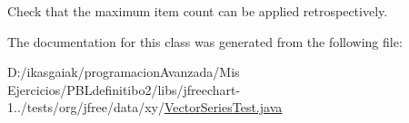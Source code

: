 Check that the maximum item count can be applied retrospectively. 

The documentation for this class was generated from the following file\+:\begin{DoxyCompactItemize}
\item 
D\+:/ikasgaiak/programacion\+Avanzada/\+Mis Ejercicios/\+P\+B\+Ldefinitibo2/libs/jfreechart-\/1../tests/org/jfree/data/xy/\mbox{\hyperlink{_vector_series_test_8java}{Vector\+Series\+Test.\+java}}\end{DoxyCompactItemize}

